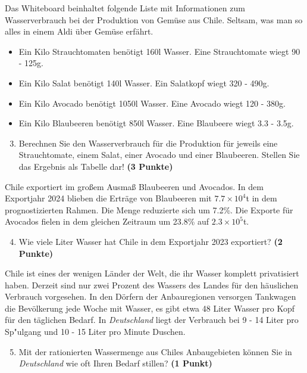 \documentclass[a4paper, 9pt]{scrartcl}\usepackage[]{graphicx}\usepackage[]{xcolor}
\begin{document}
Das Whiteboard beinhaltet folgende Liste mit Informationen zum Wasserverbrauch bei der Produktion von Gemüse aus Chile. Seltsam, was man so alles in einem Aldi über Gemüse erfährt.
  
\begin{itemize}[noitemsep]
\item Ein Kilo Strauchtomaten benötigt 160l Wasser. Eine Strauchtomate wiegt 90 - 125g.
\item Ein Kilo Salat benötigt 140l Wasser. Ein Salatkopf wiegt 320 - 490g.
\item Ein Kilo Avocado benötigt 1050l Wasser. Eine Avocado wiegt 120 - 380g.
\item Ein Kilo Blaubeeren benötigt 850l Wasser. Eine Blaubeere wiegt 3.3 - 3.5g.
\end{itemize}

\begin{enumerate}
  \setcounter{enumi}{2}
\item Berechnen Sie den Wasserverbrauch für die Produktion für jeweils eine Strauchtomate, einem Salat, einer Avocado und einer Blaubeeren. Stellen Sie das Ergebnis als Tabelle dar! \textbf{(3 Punkte)}
\end{enumerate}

Chile exportiert im großem Ausmaß Blaubeeren und Avocados. In dem Exportjahr 2024 blieben die Erträge von Blaubeeren mit \ensuremath{7.7\times 10^{4}}t in dem prognostizierten Rahmen. Die Menge reduzierte sich um 7.2\%. Die Exporte für Avocados fielen in dem gleichen Zeitraum um 23.8\% auf \ensuremath{2.3\times 10^{5}}t.

\begin{enumerate}
  \setcounter{enumi}{3}
\item Wie viele Liter Wasser hat Chile in dem Exportjahr 2023 exportiert? \textbf{(2 Punkte)}
\end{enumerate}

Chile ist eines der wenigen Länder der Welt, die ihr Wasser komplett privatisiert haben. Derzeit sind nur zwei Prozent des Wassers des Landes für den häuslichen Verbrauch vorgesehen. In den Dörfern der Anbauregionen versorgen Tankwagen die Bevölkerung jede Woche mit Wasser, es gibt etwa 48 Liter Wasser pro Kopf für den täglichen Bedarf. In \textit{Deutschland} liegt der Verbrauch bei 9 - 14 Liter pro Sp{"u}lgang und 10 - 15 Liter pro Minute Duschen.

\begin{enumerate}
  \setcounter{enumi}{4}
\item Mit der rationierten Wassermenge aus Chiles Anbaugebieten können Sie in \textit{Deutschland} wie oft Ihren Bedarf stillen? \textbf{(1 Punkt)}
\end{enumerate}
\end{document}
